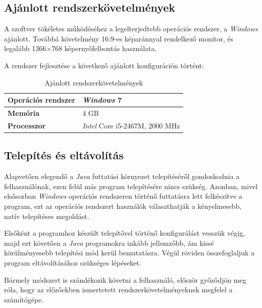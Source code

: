 \documentclass{elteikthesis}
\begin{document}
\subsection{Ajánlott rendszerkövetelmények}
A szoftver tökéletes működéséhez a legelterjedtebb operációs rendszer, a \emph{Windows} ajánlott. Továbbá követelmény 16:9-es képaránnyal rendelkező monitor, és legalább 1366$\times$768 képernyőfelbontás használata.\par
A rendszer fejlesztése a következő ajánlott konfiguráción történt:
\begin{table}[H]
	\def\arraystretch{2}
	\centering
	\begin{tabular}{|l|l|}
		\hline
		\textbf{Operációs rendszer} & \emph{Windows} 7                     \\ \hline
		\textbf{Memória}            & 4 GB                          \\ \hline
		\textbf{Processzor}         & \emph{Intel} Core i5-2467M, 2000 MHz \\ \hline
	\end{tabular}
	\caption{Ajánlott rendszerkövetelmények}
\end{table}

\subsection{Telepítés és eltávolítás}
Alapvetően elegendő a \emph{Java} futtatási környezet telepítéséről gondoskodnia a felhasználónak, ezen felül más program telepítésére nincs szükség. Azonban, mivel elsősorban \emph{Windows} operációs rendszeren történő futtatásra lett felkészítve a program, ezt az operációs rendszert használók választhatják a kényelmesebb, natív telepítéses megoldást.\par
Elsőként a programhoz készült telepítővel történő konfigurálást vesszük végig, majd ezt követően a \emph{Java} programokra inkább jellemzőbb, ám kissé körülményesebb telepítési mód kerül bemutatásra. Végül röviden összefoglaljuk a program eltávolításához szükséges lépéseket.
\par Bármely módszert is szándékozik követni a felhasználó, először győződjön meg róla, hogy az előzőekben ismertetett rendszerkövetelményeknek megfelel a számítógépe.
\end{document}
